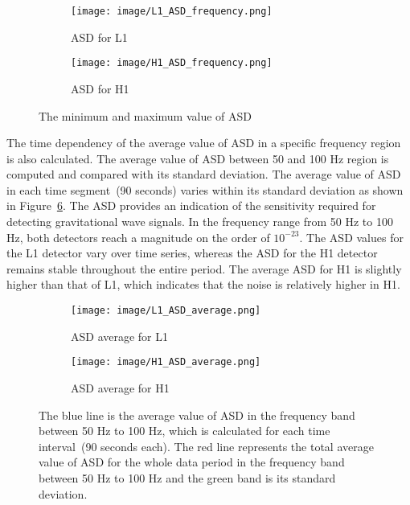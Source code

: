 \documentclass[11pt, letterpaper]{article}
\begin{document}
\begin{figure}[htbp]
  \centering
  \begin{subfigure}[b]{0.45\textwidth}
    \centering
    \texttt{[image: image/L1\_ASD\_frequency.png]}
    \caption{ASD for L1}
    \label{fig:figure1}
  \end{subfigure}
  \hfill
  \begin{subfigure}[b]{0.45\textwidth}
    \centering
    \texttt{[image: image/H1\_ASD\_frequency.png]}
    \caption{ASD for H1}
    \label{fig:figure2}
  \end{subfigure}
  \caption{The minimum and maximum value of ASD}
  \label{fig:ASD_time}
\end{figure}


The time dependency of the average value of ASD in a specific frequency region is also calculated. The average value of ASD between 50 and 100 Hz region is computed and compared with its standard deviation. The average value of ASD in each time segment~(90 seconds) varies within its standard deviation as shown in Figure~\ref{fig:ASD_average}. The ASD provides an indication of the sensitivity required for detecting gravitational wave signals. In the frequency range from 50 Hz to 100 Hz, both detectors reach a magnitude on the order of $10^{-23}$. The ASD values for the L1 detector vary over time series, whereas the ASD for the H1 detector remains stable throughout the entire period. The average ASD for H1 is slightly higher than that of L1, which indicates that the noise is relatively higher in H1.

\begin{figure}[htbp]
  \centering
  \begin{subfigure}[b]{0.45\textwidth}
    \centering
    \texttt{[image: image/L1\_ASD\_average.png]}
    \caption{ASD average for L1}
    \label{fig:figure1}
  \end{subfigure}
  \hfill
  \begin{subfigure}[b]{0.45\textwidth}
    \centering
    \texttt{[image: image/H1\_ASD\_average.png]}
    \caption{ASD average for H1}
    \label{fig:figure2}
  \end{subfigure}
  \caption{The blue line is the average value of ASD in the frequency band between 50 Hz to 100 Hz, which is calculated for each time interval~(90 seconds each). The red line represents the total average value of ASD for the whole data period in the frequency band between 50 Hz to 100 Hz and the green band is its standard deviation.}
  \label{fig:ASD_average}
\end{figure}
\end{document}
